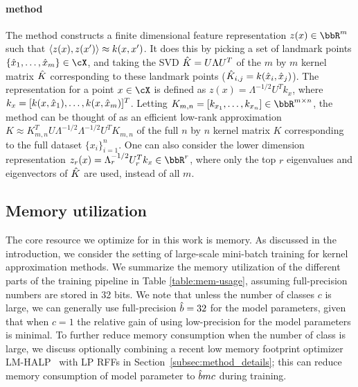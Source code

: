 \paragraph{\Nystrom method}
The \Nystrom method constructs a finite dimensional feature representation
$z(x) \in \RR^m$ such that $\left\langle z(x),z(x')\right\rangle \approx k(x,x')$.  It does this
by picking a set of landmark points $\{\hx_1,\ldots,\hx_m\} \in \cX$,
and taking the SVD $\hat{K} = U\Lambda U^T$ of the $m$ by $m$ 
kernel matrix $\hat{K}$ corresponding to these landmark points 
($\hat{K}_{i,j} = k(\hat{x}_i,\hat{x}_j)$).  The \Nystrom representation for a point $x \in \cX$
is defined as $z(x) = \Lambda^{-1/2} U^T k_x$, where $k_x = [k(x,\hat{x}_1),\ldots,k(x,\hat{x}_m)]^T$.
Letting $K_{m,n} = [k_{x_1},\ldots,k_{x_n}] \in \RR^{m\times n}$, 
the \Nystrom method can be thought of as an efficient low-rank approximation
$K \approx K_{m,n}^T U \Lambda^{-1/2}\Lambda^{-1/2} U^T K_{m,n}$ of the full
$n$ by $n$ kernel matrix $K$ corresponding to the full dataset $\{x_i\}_{i=1}^n$.
One can also consider the lower dimension \Nystrom representation
$z_r(x) = \Lambda_r^{-1/2} U_r^T k_x \in \RR^r$, where only the top $r$ eigenvalues and
eigenvectors of $\hat{K}$ are used, instead of all $m$.

\subsection{Memory utilization}
\label{subsec:memory_utils}
The core resource we optimize for in this work is memory.  As discussed in the introduction, we consider the setting of large-scale mini-batch training for kernel approximation methods.  We summarize the memory utilization of the different parts of the training pipeline in Table \ref{table:mem-usage}, assuming full-precision numbers are stored in 32 bits. We note that unless the number of classes $c$ is large, we can generally use full-precision $\hat{b} = 32$ for the model parameters, given that when $c=1$ the relative gain of using low-precision for the model parameters is minimal. To further reduce memory consumption when the number of class is large, we discuss optionally combining a recent low memory footprint optimizer LM-HALP~\cite{halp18} with LP RFFs in Section~\ref{subsec:method_details}; this can reduce memory consumption of model parameter to $\hat{b} mc$ during training.

